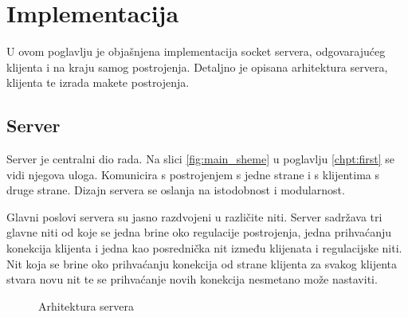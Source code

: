 \newpage
\chapter{Implementacija}

U ovom poglavlju je objašnjena implementacija socket servera, odgovarajućeg
klijenta i na kraju samog postrojenja.
Detaljno je opisana arhitektura servera, klijenta te izrada makete postrojenja.

\section{Server}

Server je centralni dio rada. Na slici \ref{fig:main_sheme} u poglavlju
\ref{chpt:first} se vidi njegova uloga. Komunicira s postrojenjem s jedne strane
i s klijentima s druge strane. Dizajn servera se oslanja na istodobnost i
modularnost.

Glavni poslovi servera su jasno razdvojeni u različite niti. Server
sadržava tri glavne niti od koje se jedna brine oko regulacije postrojenja,
jedna prihvaćanju konekcija klijenta i jedna kao posrednička nit između
klijenata i regulacijske niti. Nit koja se brine oko prihvaćanju konekcija od
strane klijenta za svakog klijenta stvara novu nit te se prihvaćanje novih
konekcija nesmetano može nastaviti.

\begin{figure}[H]
\centering
{}
\caption{Arhitektura servera}
\label{fig:architecture}
\end{figure}

